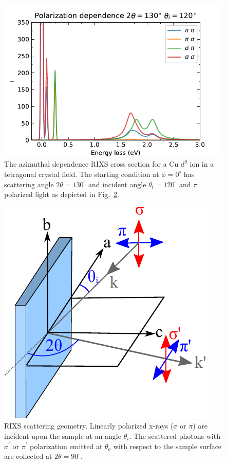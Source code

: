 \documentclass[aps,onecolumn, notitlepage, longbibliography]{revtex4-1}
\begin{document}
\begin{figure}
    \includegraphics{pol_dep.pdf}
    \caption{The azimuthal dependence RIXS cross section for a Cu $d^9$ ion in a tetragonal crystal field. The starting condition at $\phi=0^{\circ}$ has scattering angle $2\theta=130^{\circ}$ and incident angle $\theta_i=120^{\circ}$ and $\pi$ polarized light as depicted in Fig.~\ref{geometry}. \label{pol_dep}}
\end{figure}

\begin{figure}
\includegraphics[width=1.7 in]{geometry.pdf}
\caption{RIXS scattering geometry. Linearly polarized x-rays ($\sigma$ or $\pi$) are incident upon the sample at an angle $\theta _i$. The scattered photons with $\sigma^\prime$ or $\pi^\prime$ polarization emitted at $\theta_o$ with respect to the sample surface are collected at $2\theta = 90^\circ$. \label{geometry}}
\end{figure}

\end{document}
